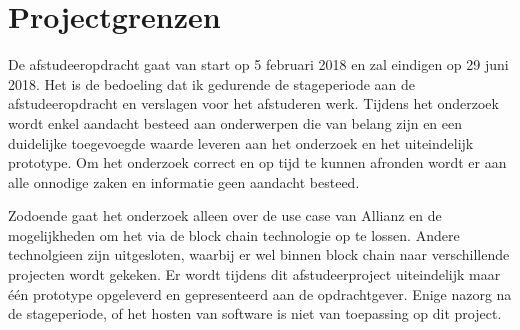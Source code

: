 \chapter{Projectgrenzen}
De afstudeeropdracht gaat van start op 5 februari 2018 en zal eindigen op 29 juni 2018. Het is de bedoeling dat ik gedurende de stageperiode aan de afstudeeropdracht en verslagen voor het afstuderen werk. Tijdens het onderzoek wordt enkel aandacht besteed aan onderwerpen die van belang zijn en een duidelijke toegevoegde waarde leveren aan het onderzoek en het uiteindelijk prototype. Om het onderzoek correct en op tijd te kunnen afronden wordt er aan alle onnodige zaken en informatie geen aandacht besteed.\par
Zodoende gaat het onderzoek alleen over de use case van Allianz en de mogelijkheden om het via de block chain technologie op te lossen. Andere technolgieen zijn uitgesloten, waarbij er wel binnen block chain naar verschillende projecten wordt gekeken. Er wordt tijdens dit afstudeerproject uiteindelijk maar één prototype opgeleverd en gepresenteerd aan de opdrachtgever. Enige nazorg na de stageperiode, of het hosten van software is niet van toepassing op dit project.